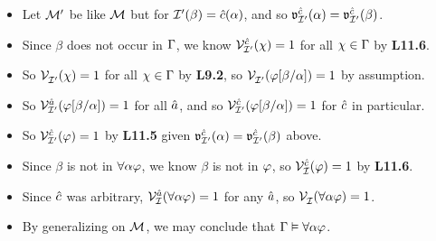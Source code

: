 \documentclass[a4paper, 11pt]{article} %
\begin{document}
\begin{itemize}
      \item Let $\mathcal{M}'$ be like $\mathcal{M}$ but for $\mathcal{I}'(\beta)=\hat{c}(\alpha)$, and so $\mathfrak{v}_{\mathcal{I}'}^{\hat{c}}(\alpha)=\mathfrak{v}_{\mathcal{I}'}^{\hat{c}}(\beta)$.
      \item Since $\beta$ does not occur in $\Gamma$, we know $\mathcal{V}_{\mathcal{I}'}^{\hat{c}}(\chi) = 1$ for all $\chi \in \Gamma$ by \textbf{L11.6}.
      \item So $\mathcal{V}_{\mathcal{I}'}^{}(\chi) = 1$ for all $\chi\in\Gamma$ by \textbf{L9.2}, so $\mathcal{V}_{\mathcal{I}'}^{}(\varphi[\beta/\alpha]) = 1$ by assumption.
      \item So $\mathcal{V}_{\mathcal{I}'}^{\hat{a}}(\varphi[\beta/\alpha])=1$ for all $\hat{a}$, and so $\mathcal{V}_{\mathcal{I}'}^{\hat{c}}(\varphi[\beta/\alpha])=1$ for $\hat{c}$ in particular.
      \item So $\mathcal{V}_{\mathcal{I}'}^{\hat{c}}(\varphi) = 1$ by \textbf{L11.5} given $\mathfrak{v}_{\mathcal{I}'}^{\hat{c}}(\alpha) = \mathfrak{v}_{\mathcal{I}'}^{\hat{c}}(\beta)$ above. 
      \item Since $\beta$ is not in $\forall \alpha\varphi$, we know $\beta$ is not in $\varphi$, so $\mathcal{V}_{\mathcal{I}}^{\hat{c}}(\varphi)=1$ by \textbf{L11.6}.
      \item Since $\hat{c}$ was arbitrary, $\mathcal{V}_{\mathcal{I}}^{\hat{a}}(\forall \alpha\varphi)=1$ for any $\hat{a}$, so $\mathcal{V}_{\mathcal{I}}^{}(\forall \alpha\varphi)=1$.
      \item By generalizing on $\mathcal{M}$, we may conclude that $\Gamma \vDash \forall \alpha\varphi$.

\end{itemize}
\end{document}
